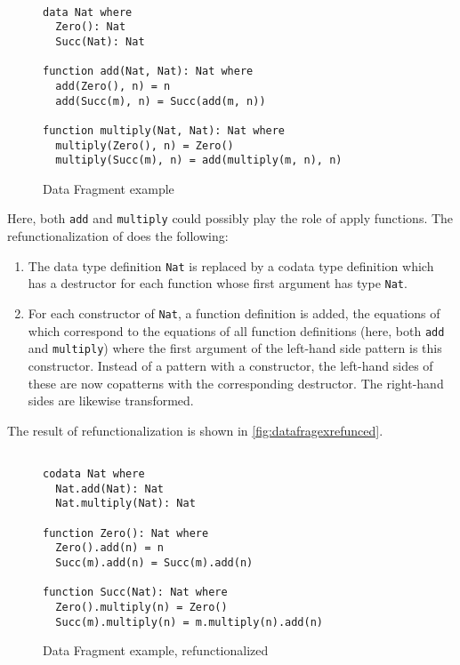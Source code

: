 \begin{figure}
\begin{lstlisting}

data Nat where
  Zero(): Nat
  Succ(Nat): Nat

function add(Nat, Nat): Nat where
  add(Zero(), n) = n
  add(Succ(m), n) = Succ(add(m, n))

function multiply(Nat, Nat): Nat where
  multiply(Zero(), n) = Zero()
  multiply(Succ(m), n) = add(multiply(m, n), n)

\end{lstlisting}
\caption{Data Fragment example}
\label{fig:datafragex}
\end{figure}

Here, both \texttt{add} and \texttt{multiply} could possibly play the role of apply functions. The refunctionalization of \citeauthor{rendel15automatic} does the following:
\begin{enumerate}
\item The data type definition \texttt{Nat} is replaced by a codata type definition which has a destructor for each function whose first argument has type \texttt{Nat}.
\item For each constructor of \texttt{Nat}, a function definition is added, the equations of which correspond to the equations of all function definitions (here, both \texttt{add} and \texttt{multiply}) where the first argument of the left-hand side pattern is this constructor. Instead of a pattern with a constructor, the left-hand sides of these are now copatterns with the corresponding destructor. The right-hand sides are likewise transformed.
\end{enumerate}
The result of refunctionalization is shown in \autoref{fig:datafragexrefunced}.

\begin{figure}
\begin{lstlisting}

codata Nat where
  Nat.add(Nat): Nat
  Nat.multiply(Nat): Nat

function Zero(): Nat where
  Zero().add(n) = n
  Succ(m).add(n) = Succ(m).add(n)

function Succ(Nat): Nat where
  Zero().multiply(n) = Zero()
  Succ(m).multiply(n) = m.multiply(n).add(n)

\end{lstlisting}
\caption{Data Fragment example, refunctionalized}
\label{fig:datafragexrefunced}
\end{figure}


